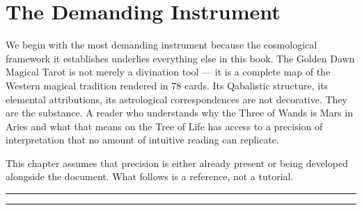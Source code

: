 \section{The Demanding Instrument}\label{before-chapter-one-the-golden-dawn-magical-tarot}

We begin with the most demanding instrument because the cosmological framework it establishes underlies everything else in this book. The Golden Dawn Magical Tarot is not merely a divination tool --- it is a complete map of the Western magical tradition rendered in 78 cards. Its Qabalistic structure, its elemental attributions, its astrological correspondences are not decorative. They are the substance. A reader who understands why the Three of Wands is Mars in Aries and what that means on the Tree of Life has access to a precision of interpretation that no amount of intuitive reading can replicate.

This chapter assumes that precision is either already present or being developed alongside the document. What follows is a reference, not a tutorial.

\begin{center}\rule{0.5\linewidth}{0.5pt}\end{center}

\begin{center}\rule{0.5\linewidth}{0.5pt}\end{center}
